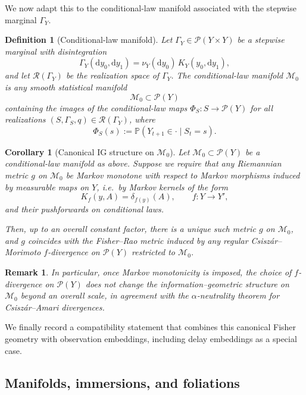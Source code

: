 \documentclass[11pt]{article}
\newtheorem{definition}{Definition}
\newtheorem{remark}{Remark}
\newtheorem{corollary}{Corollary}
\newcommand{\Rcal}{\mathcal{R}}
\newcommand{\Pcal}{\mathcal{P}}
\newcommand{\Mcal}{\mathcal{M}}
\begin{document}
We now adapt this to the conditional-law manifold associated with the
stepwise marginal $\Gamma_Y$.

\begin{definition}[Conditional-law manifold]
Let $\Gamma_Y\in\Pcal(Y\times Y)$ be a stepwise marginal with
disintegration
\[
  \Gamma_Y(\mathrm dy_0,\mathrm dy_1)
  = \nu_Y(\mathrm dy_0)\,K_Y(y_0,\mathrm dy_1),
\]
and let $\Rcal(\Gamma_Y)$ be the realization space of $\Gamma_Y$. The
\emph{conditional-law manifold} $\Mcal_0$ is any smooth statistical
manifold
\[
  \Mcal_0 \subset \Pcal(Y)
\]
containing the images of the conditional-law maps
$\Phi_S : S \to \Pcal(Y)$ for all realizations
$(S,\Gamma_S,q)\in\Rcal(\Gamma_Y)$, where
\[
  \Phi_S(s)
  := \mathbb P(Y_{t+1}\in\cdot \mid S_t=s).
\]
\end{definition}

\begin{corollary}[Canonical IG structure on $\Mcal_0$]
\label{cor:canonical-ig-kind of object}
Let $\Mcal_0\subset\Pcal(Y)$ be a conditional-law manifold as above.
Suppose we require that any Riemannian metric $g$ on $\Mcal_0$ be
Markov monotone with respect to Markov morphisms induced by measurable
maps on $Y$, i.e.\ by Markov kernels of the form
\[
  K_f(y,A) = \delta_{f(y)}(A),
  \qquad f:Y\to Y',
\]
and their pushforwards on conditional laws.

Then, up to an overall constant factor, there is a unique such metric
$g$ on $\Mcal_0$, and $g$ coincides with the Fisher--Rao metric induced
by any regular Csiszár–Morimoto $f$-divergence on $\Pcal(Y)$ restricted
to $\Mcal_0$.
\end{corollary}

\begin{remark}
In particular, once Markov monotonicity is imposed, the choice of
$f$-divergence on $\Pcal(Y)$ does not change the information--geometric
structure on $\Mcal_0$ beyond an overall scale, in agreement with the
$\alpha$-neutrality theorem for Csiszár--Amari divergences.
\end{remark}

We finally record a compatibility statement that combines this canonical
Fisher geometry with observation embeddings, including delay embeddings
as a special case.



\subsection{Manifolds, immersions, and foliations}
\end{document}
